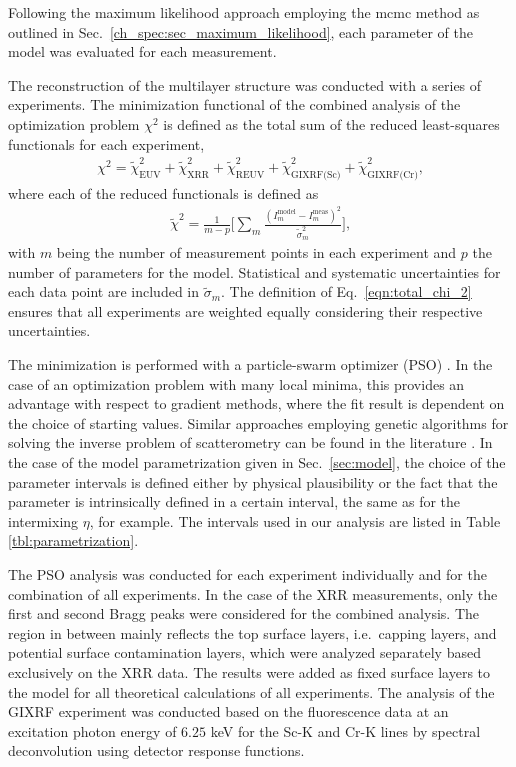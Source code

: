 Following the maximum likelihood approach employing the \gls{mcmc} method as outlined in Sec.~\ref{ch_spec:sec_maximum_likelihood}, each parameter of the model was evaluated for each measurement.


The reconstruction of the multilayer structure was conducted with a series of 
experiments. The minimization functional of the combined analysis of the 
optimization problem $\chi^2$ is defined as the total sum of the reduced 
least-squares functionals for each experiment,
\begin{align}
\chi^2 = \tilde{\chi}^2_\text{EUV} +\tilde{\chi}^2_\text{XRR} 
+\tilde{\chi}^2_\text{REUV} + 
\tilde{\chi}^2_\text{GIXRF(Sc)}+\tilde{\chi}^2_\text{GIXRF(Cr)}\text{,} 
\label{eqn:total_chi_2}
\end{align}
where each of the reduced functionals is defined as
\begin{align}
\tilde{\chi}^2 = \frac{1}{m - p} \bigg[\sum\limits_{m} \frac{(I_m^\text{model} 
- I_m^\text{meas})^2}{\tilde{\sigma}_m^2} \bigg] \text{,} 
\label{eqn:reduced_chi_2}
\end{align}
with $m$ being the number of measurement points in each experiment and $p$ the 
number of parameters for the model. Statistical and systematic uncertainties 
for each data point are included in $\tilde{\sigma}_m$. The definition of 
Eq.~\eqref{eqn:total_chi_2} ensures that all experiments are weighted equally 
considering their respective uncertainties.

The minimization is performed with a particle-swarm optimizer (PSO) 
\cite{kennedy_particle_2011}. In the case of an optimization problem with many local 
minima, this provides an advantage with respect to gradient methods, where the 
fit result is dependent on the choice of starting values. Similar approaches 
employing genetic algorithms for solving the inverse problem of scatterometry 
can be found in the literature \cite{del_rio_modeling_2000}. In the case of the model 
parametrization given in Sec.~\ref{sec:model}, the choice of the parameter 
intervals is defined either by physical plausibility or the fact that the 
parameter is intrinsically defined in a certain interval, the same as for the 
intermixing $\eta$, for example. The intervals used in our analysis are listed 
in Table \ref{tbl:parametrization}.

The PSO analysis was conducted for each experiment individually and for the 
combination of all experiments. In the case of the XRR measurements, only the 
first and second Bragg peaks were considered for the combined analysis. The 
region in between mainly reflects the top surface layers, i.e.~capping layers, 
and potential surface contamination layers, which were analyzed separately 
based exclusively on the XRR data. The results were added as fixed surface 
layers to the model for all theoretical calculations of all experiments. The 
analysis of the GIXRF experiment was conducted based on the fluorescence data 
at an excitation photon energy of $6.25$ keV for the Sc-K and Cr-K lines by spectral 
deconvolution using detector response functions.



